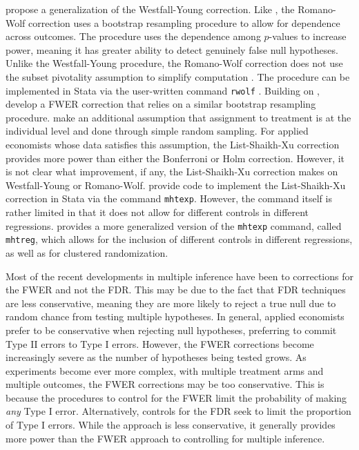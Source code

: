 \documentclass[11pt]{article}
\begin{document}
\cite{romano_exact_2005, romano_stepwise_2005} propose a generalization of the Westfall-Young correction. Like \cite{westfall_resampling_1993}, the Romano-Wolf correction uses a bootstrap resampling procedure to allow for dependence across outcomes. The procedure uses the dependence among $p$-values to increase power, meaning it has greater ability to detect genuinely false null hypotheses. Unlike the Westfall-Young procedure, the Romano-Wolf correction does not use the subset pivotality assumption to simplify computation \citep{clarke_romano-wolf_2019}. The procedure can be implemented in Stata via the user-written command \texttt{rwolf} \citep{clarke_rwolf_2016}. Building on \cite{romano_balanced_2010}, \cite{list_multiple_2019} develop a FWER correction that relies on a similar bootstrap resampling procedure. \cite{list_multiple_2019} make an additional assumption that assignment to treatment is at the individual level and done through simple random sampling. For applied economists whose data satisfies this assumption, the List-Shaikh-Xu correction provides more power than either the Bonferroni or Holm correction. However, it is not clear what improvement, if any, the List-Shaikh-Xu correction makes on Westfall-Young or Romano-Wolf. \cite{seidel_mhtexp_2016} provide code to implement the List-Shaikh-Xu correction in Stata via the command \texttt{mhtexp}. However, the command itself is rather limited in that it does not allow for different controls in different regressions. \cite{steinmayr_mhtreg_2020} provides a more generalized version of the \texttt{mhtexp} command, called \texttt{mhtreg}, which allows for the inclusion of different controls in different regressions, as well as for clustered randomization.

Most of the recent developments in multiple inference have been to corrections for the FWER and not the FDR. This may be due to the fact that FDR techniques are less conservative, meaning they are more likely to reject a true null due to random chance from testing multiple hypotheses. In general, applied economists prefer to be conservative when rejecting null hypotheses, preferring to commit Type II errors to Type I errors. However, the FWER corrections become increasingly severe as the number of hypotheses being tested grows. As experiments become ever more complex, with multiple treatment arms and multiple outcomes, the FWER corrections may be too conservative. This is because the procedures to control for the FWER limit the probability of making \emph{any} Type I error. Alternatively, controls for the FDR seek to limit the proportion of Type I errors. While the approach is less conservative, it generally provides more power than the FWER approach to controlling for multiple inference.
\end{document}
